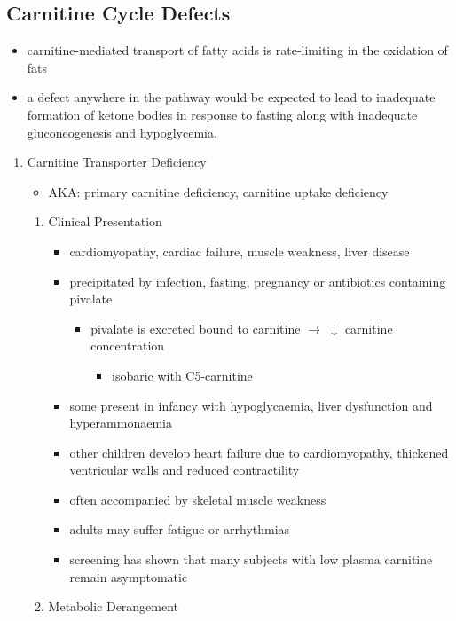 \documentclass{scrartcl}
\begin{document}
\subsection{Carnitine Cycle Defects}
\label{sec:orgbae1a06}
\begin{itemize}
\item carnitine-mediated transport of fatty acids is rate-limiting in the
oxidation of fats
\item a defect anywhere in the pathway would be expected to lead to
inadequate formation of ketone bodies in response to fasting along
with inadequate gluconeogenesis and hypoglycemia.
\end{itemize}
\begin{enumerate}
\item Carnitine Transporter Deficiency
\label{sec:org1f63b10}
\begin{itemize}
\item AKA: primary carnitine deficiency, carnitine uptake deficiency
\end{itemize}
\begin{enumerate}
\item Clinical Presentation
\label{sec:orgfcb37b0}
\begin{itemize}
\item cardiomyopathy, cardiac failure, muscle weakness, liver disease
\item precipitated by infection, fasting, pregnancy or antibiotics containing pivalate
\begin{itemize}
\item pivalate is excreted bound to carnitine \(\to\) \(\downarrow\) carnitine concentration
\begin{itemize}
\item isobaric with C5-carnitine
\end{itemize}
\end{itemize}
\item some present in infancy with hypoglycaemia, liver dysfunction and hyperammonaemia
\item other children develop heart failure due to cardiomyopathy,
thickened ventricular walls and reduced contractility
\item often accompanied by skeletal muscle weakness
\item adults may suffer fatigue or arrhythmias
\item screening has shown that many subjects with low plasma carnitine remain asymptomatic
\end{itemize}
\item Metabolic Derangement

\end{enumerate}
\end{enumerate}
\end{document}
